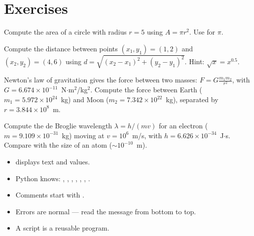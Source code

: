 \section{Exercises}

\begin{exercise}
Compute the area of a circle with radius $r = 5$ using $A = \pi r^2$. Use  for $\pi$.
\end{exercise}

\begin{exercise}
Compute the distance between points $(x_1, y_1) = (1, 2)$ and $(x_2, y_2) = (4, 6)$ using $d = \sqrt{(x_2-x_1)^2 + (y_2-y_1)^2}$. Hint: $\sqrt{x} = x^{0.5}$.
\end{exercise}

\begin{exercise}
Newton's law of gravitation gives the force between two masses: $F = G\frac{m_1 m_2}{r^2}$, with $G = 6.674 \times 10^{-11}$~N$\cdot$m$^2$/kg$^2$. Compute the force between Earth ($m_1 = 5.972 \times 10^{24}$~kg) and Moon ($m_2 = 7.342 \times 10^{22}$~kg), separated by $r = 3.844 \times 10^{8}$~m.
\end{exercise}

\begin{exercise}
Compute the de Broglie wavelength $\lambda = h / (mv)$ for an electron ($m = 9.109 \times 10^{-31}$~kg) moving at $v = 10^6$~m/s, with $h = 6.626 \times 10^{-34}$~J$\cdot$s. Compare with the size of an atom ($\sim 10^{-10}$~m).
\end{exercise}

\begin{keyformulas}[title=\textbf{Chapter Summary}]
\begin{itemize}
\item {} displays text and values.
\item Python knows: \py{+}, \py{-}, \py{*}, \py{/}, \py{//}, \py{\%}, \py{**}.
\item Comments start with \py{#}.
\item Errors are normal --- read the message from bottom to top.
\item A  script is a reusable program.
\end{itemize}
\end{keyformulas}

